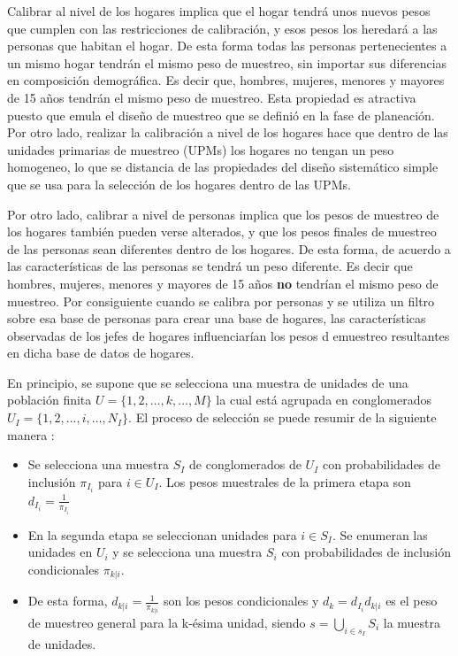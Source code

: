 \documentclass[12pt,spanish,]{book}
\providecommand{\tightlist}{%
  \setlength{\itemsep}{0pt}\setlength{\parskip}{0pt}}
\begin{document}
Calibrar al nivel de los hogares implica que el hogar tendrá unos nuevos pesos que cumplen con las restricciones de calibración, y esos pesos los heredará a las personas que habitan el hogar. De esta forma todas las personas pertenecientes a un mismo hogar tendrán el mismo peso de muestreo, sin importar sus diferencias en composición demográfica. Es decir que, hombres, mujeres, menores y mayores de 15 años tendrán el mismo peso de muestreo. Esta propiedad es atractiva puesto que emula el diseño de muestreo que se definió en la fase de planeación. Por otro lado, realizar la calibración a nivel de los hogares hace que dentro de las unidades primarias de muestreo (UPMs) los hogares no tengan un peso homogeneo, lo que se distancia de las propiedades del diseño sistemático simple que se usa para la selección de los hogares dentro de las UPMs.

Por otro lado, calibrar a nivel de personas implica que los pesos de muestreo de los hogares también pueden verse alterados, y que los pesos finales de muestreo de las personas sean diferentes dentro de los hogares. De esta forma, de acuerdo a las características de las personas se tendrá un peso diferente. Es decir que hombres, mujeres, menores y mayores de 15 años \textbf{no} tendrían el mismo peso de muestreo. Por consiguiente cuando se calibra por personas y se utiliza un filtro sobre esa base de personas para crear una base de hogares, las características observadas de los jefes de hogares influenciarían los pesos d emuestreo resultantes en dicha base de datos de hogares.

En principio, se supone que se selecciona una muestra de unidades de una población finita \(U = \lbrace 1,2,\ldots,k,\ldots,M\rbrace\) la cual está agrupada en conglomerados \(U_I = \lbrace 1, 2,\ldots, i, \ldots, N_I \rbrace\). El proceso de selección se puede resumir de la siguiente manera \autocite{Gutierrez_2016}:

\begin{itemize}
\tightlist
\item
  Se selecciona una muestra \(S_I\) de conglomerados de \(U_I\) con probabilidades de inclusión \(\pi_{I_i}\) para \(i\in U_I\). Los pesos muestrales de la primera etapa son \(d_{I_i} = \frac{1}{\pi_{I_i}}\)
\item
  En la segunda etapa se seleccionan unidades para \(i\in S_I\). Se enumeran las unidades en \(U_i\) y se selecciona una muestra \(S_i\) con probabilidades de inclusión condicionales \(\pi_{k|i}\).
\item
  De esta forma, \(d_{k|i} = \frac{1}{\pi_{k|i}}\) son los pesos condicionales y \(d_k = d_{I_i}d_{k|i}\) es el peso de muestreo general para la k-ésima unidad, siendo \(s =\bigcup_{i\in s_I}S_i\) la muestra de unidades.
\end{itemize}
\end{document}
